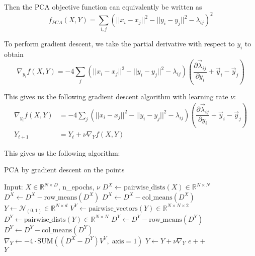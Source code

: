 \documentclass{article}
\theoremstyle{definition}
\begin{document}
Then the PCA objective function can equivalently be written as
\begin{equation}
    f_{PCA}(X, Y) = \sum_{i, j} \left( ||x_i - x_j||^2 - ||y_i - y_j||^2 - \lambda_{ij} \right) ^2
\end{equation}

To perform gradient descent, we take the partial derivative with respect to $y_i$ to obtain
\[ \nabla_{y_i} f(X, Y) = -4 \sum_{j} (||x_i - x_j||^2 - ||y_i - y_j||^2 - \lambda_{ij}) (\dfrac{\partial \vec{\lambda}_{ij}}{\partial y_i} + \vec{y}_i - \vec{y}_j) \]

This gives us the following gradient descent algorithm with learning rate $\nu$:
\begin{equation*}
    \boxed{
    \begin{aligned}
        \nabla_{y_i} f(X, Y) &= -4 \sum_{j} (||x_i - x_j||^2 - ||y_i - y_j||^2 - \lambda_{ij}) \left( \dfrac{\partial \vec{\lambda}_{ij}}{\partial y_i}
        + \vec{y}_i - \vec{y}_j \right) \\
        Y_{t + 1} &= Y_t + \nu \nabla_{Y} f(X, Y)
    \end{aligned}
    }
\end{equation*}

This gives us the following algorithm:
\begin{algorithm}
\caption{PCA by gradient descent on the points}\label{alg:cap}
\begin{algorithmic}
\Require Input: $X \in \mathbb{R}^{N \times D}$, n\_epochs, $\nu$
\State $D^X \gets \text{pairwise\_dists}(X) \in \mathbb{R}^{N \times N}$
\State $D^X \gets D^X - \text{row\_means}(D^X)$
\State $D^X \gets D^X - \text{col\_means}(D^X)$
\State $Y \gets \mathcal{N}_{(0, 1)} \in \mathbb{R}^{N \times d}$
\State $V^Y \gets \text{pairwise\_vectors}(Y) \in \mathbb{R}^{N \times N \times 2}$
\\
\State $D^Y \gets \text{pairwise\_dists}(Y) \in \mathbb{R}^{N \times N}$
\State $D^Y \gets D^Y - \text{row\_means}(D^Y)$
\State $D^Y \gets D^Y - \text{col\_means}(D^Y)$
\\
\State $ \nabla_Y \gets -4 \cdot \text{SUM}\left(( D^X - D^Y ) V^Y, \; \text{axis}=1 \right)$
\State $ Y \gets Y + \nu \nabla_Y$
\State $e++$
\EndWhile
\\
\Return $Y$
\end{algorithmic}
\end{algorithm}
\end{document}
